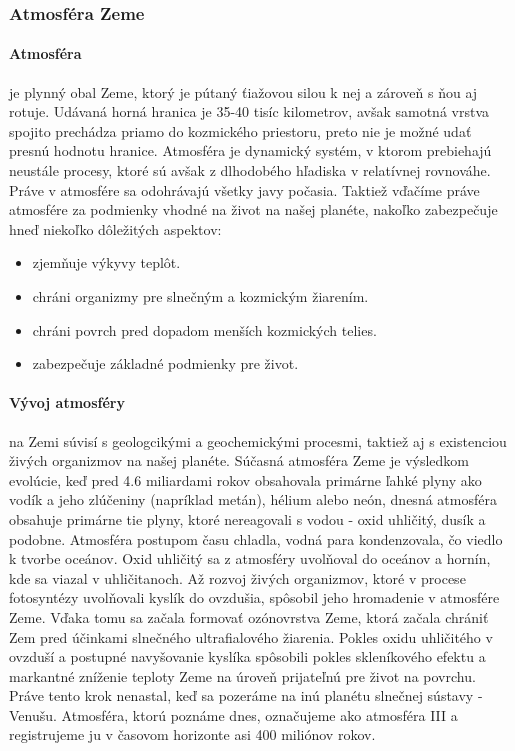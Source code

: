 \subsubsection{Atmosféra Zeme}
\label{atmosferaZeme}
\paragraph{Atmosféra}je plynný obal Zeme, ktorý je pútaný ťiažovou silou k nej a zároveň s ňou aj rotuje. Udávaná horná hranica je 35-40 tisíc kilometrov, avšak samotná vrstva spojito prechádza priamo do kozmického priestoru, preto nie je možné udať presnú hodnotu hranice. Atmosféra je dynamický systém, v ktorom prebiehajú neustále procesy, ktoré sú avšak z dlhodobého hľadiska v relatívnej rovnováhe. Práve v atmosfére sa odohrávajú všetky javy počasia. Taktiež vďačíme práve atmosfére za podmienky vhodné na život na našej planéte, nakoľko zabezpečuje hneď niekoľko dôležitých aspektov:
\begin{itemize}
  \item zjemňuje výkyvy teplôt.
  \item chráni organizmy pre slnečným a kozmickým žiarením.
  \item chráni povrch pred dopadom menších kozmických telies.
  \item zabezpečuje základné podmienky pre život.
\end{itemize}

\paragraph{Vývoj atmosféry} na Zemi súvisí s geologcikými a geochemickými procesmi, taktiež aj s existenciou živých organizmov na našej planéte. Súčasná atmosféra Zeme je výsledkom evolúcie, keď pred 4.6 miliardami rokov obsahovala primárne ľahké plyny ako vodík a jeho zlúčeniny (napríklad metán), hélium alebo neón, dnesná atmosféra obsahuje primárne tie plyny, ktoré nereagovali s vodou - oxid uhličitý, dusík a podobne. Atmosféra postupom času chladla, vodná para kondenzovala, čo viedlo k tvorbe oceánov. Oxid uhličitý sa z atmosféry uvolňoval do oceánov a hornín, kde sa viazal v uhličitanoch. Až rozvoj živých organizmov, ktoré v procese fotosyntézy uvolňovali kyslík do ovzdušia, spôsobil jeho hromadenie v atmosfére Zeme. Vďaka tomu sa začala formovať ozónovrstva Zeme, ktorá začala chrániť Zem pred účinkami slnečného ultrafialového žiarenia. Pokles oxidu uhličitého v ovzduší a postupné navyšovanie kyslíka spôsobili pokles skleníkového efektu a markantné zníženie teploty Zeme na úroveň prijateľnú pre život na povrchu. Práve tento krok nenastal, keď sa pozeráme na inú planétu slnečnej sústavy - Venušu. Atmosféra, ktorú poznáme dnes, označujeme ako atmosféra III a registrujeme ju v časovom horizonte asi 400 miliónov rokov. 
